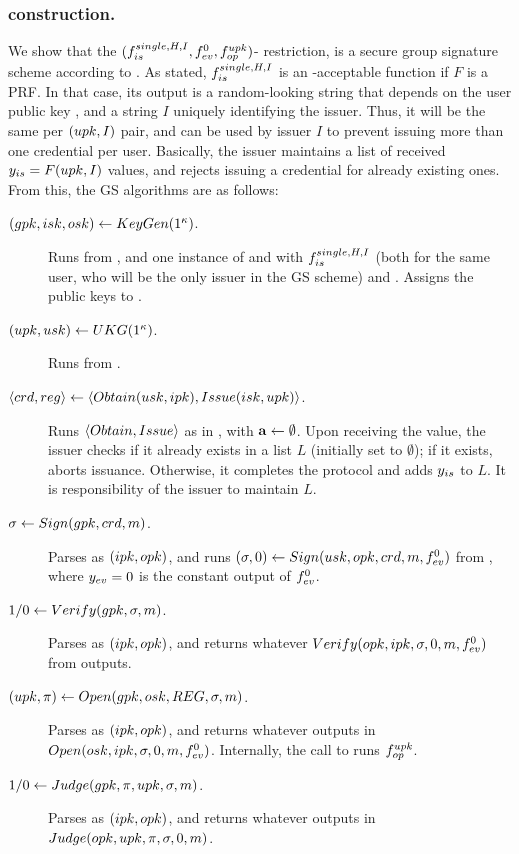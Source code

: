 \subsubsection{\CUASGS construction.} %
We show that the $(f_{is}^{single,H,I},f_{ev}^0,f_{op}^{upk})$-\CUASGen
restriction, is a secure group signature scheme according to \cite{bsz05}.
As stated, $f_{is}^{single,H,I}$ is an \UAS-acceptable function if $F$ is a
PRF. In that case, its output is a random-looking string that depends on the
user public key \upk, and a string $I$ uniquely identifying the issuer. Thus, it
will be the same per $(upk,I)$ pair, and can be used by issuer $I$ to prevent
issuing more than one credential per user. Basically, the issuer maintains a
list of received $y_{is} = F(upk,I)$ values, and rejects issuing a credential
for already existing ones. From this, the GS algorithms are as
follows:

\begin{description}
\item[$(gpk,isk,osk) \gets KeyGen(1^\kappa)$.] Runs \Setup from \CUASGen,
  and one instance of \KeyGen and \ISet with $f_{is}^{single,H,I}$ (both for
  the same user, who will be the only issuer in the GS scheme) and \OKeyGen.
  Assigns the public keys to \gpk.
\item[$(upk,usk) \gets UKG(1^\kappa)$.] Runs \KeyGen from \CUASGen.
\item[$\langle crd,reg \rangle \gets
  \langle Obtain(usk,ipk),Issue(isk,upk)\rangle$.] Runs $\langle Obtain,
  Issue\rangle$ as in \CUASGen, with $\mathbf{a} \gets \emptyset$. Upon receiving
  the \yissue value, the issuer checks if it already exists in a list $L$
  (initially set to $\emptyset$); if it exists, aborts issuance. Otherwise, it
  completes the protocol and adds $y_{is}$ to $L$. It is responsibility of the
  issuer to maintain $L$.
\item[$\sigma \gets Sign(gpk,crd,m)$.] Parses \gpk as $(ipk,opk)$, and
  runs $(\sigma,0) \gets Sign(usk,opk,crd,m,f_{ev}^0)$ from \CUASGen,
  where $y_{ev} = 0$ is the constant output of $f_{ev}^0$.
\item[$1/0 \gets Verify(gpk,\sigma,m)$.] Parses \gpk as $(ipk,opk)$, and
  returns whatever $Verify(opk,ipk,\sigma,0,m,f_{ev}^0)$ from \CUASGen
  outputs.
\item[$(\upk,\pi) \gets \Open(\gpk,\osk,\trans,\sig,\msg)$.] Parses \gpk as
  $(ipk,opk)$, and returns whatever \CUASGen outputs in $Open(osk,ipk,\sigma,
  0,m,f_{ev}^0)$. Internally, the call to \Open runs $f_{op}^{upk}$.
\item[$1/0 \gets Judge(gpk,\pi,upk,\sigma,m)$.] Parses \gpk as $(ipk,
  opk)$, and returns whatever \CUASGen outputs in $Judge(opk,upk,\pi,\sigma,
  0,m)$.
\end{description}

